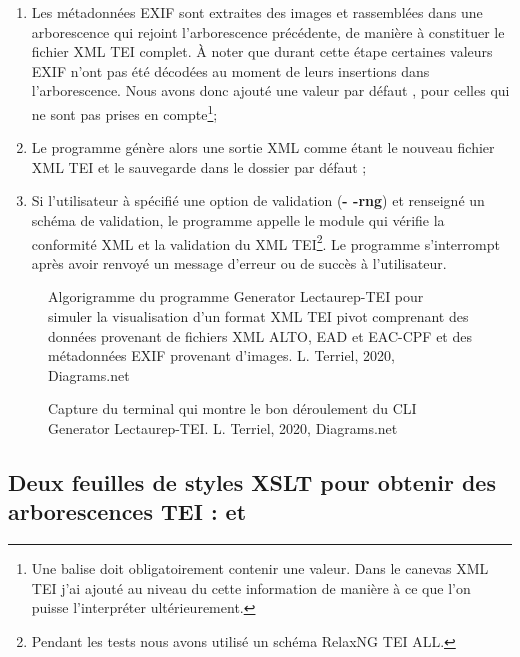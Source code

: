 \begin{enumerate}
    \item Les métadonnées EXIF sont extraites des images et rassemblées dans une arborescence  qui rejoint l'arborescence précédente, de manière à constituer le fichier XML TEI complet. À noter que durant cette étape certaines valeurs EXIF n'ont pas été décodées au moment de leurs insertions dans l'arborescence. Nous avons donc ajouté une valeur par défaut , pour celles qui ne sont pas prises en compte\footnote{Une balise  doit obligatoirement contenir une valeur. Dans le canevas XML TEI j'ai ajouté au niveau du  cette information de manière à ce que l'on puisse l'interpréter ultérieurement.};
    \item Le programme génère alors une sortie XML comme étant le nouveau fichier XML TEI et le sauvegarde dans le dossier par défaut 
    ;
    \item Si l'utilisateur à spécifié une option de validation (\textbf{- -rng}) et renseigné un schéma de validation, le programme appelle le module  qui vérifie la conformité XML et la validation du XML TEI\footnote{Pendant les tests nous avons utilisé un schéma RelaxNG TEI ALL.}. Le programme s'interrompt après avoir renvoyé un message d'erreur ou de succès à l'utilisateur.
\end{enumerate}
\begin{figure}[H]
    \centering
    \centerline{}
    \caption{Algorigramme du programme Generator Lectaurep-TEI pour simuler la visualisation d'un format XML TEI pivot comprenant des données provenant de fichiers XML ALTO, EAD et EAC-CPF et des métadonnées EXIF provenant d'images.   \textcopyright L. Terriel, 2020, Diagrams.net}
    \label{fig:generateur_tei}
\end{figure}
\begin{figure}[h]
    \centering
    \centerline{}
    \caption{Capture du terminal qui montre le bon déroulement du CLI Generator Lectaurep-TEI.   \textcopyright L. Terriel, 2020, Diagrams.net}
    \label{fig:prompt-lec-tei}
\end{figure}

\subsection{Deux feuilles de styles XSLT pour obtenir des arborescences TEI :  et }

